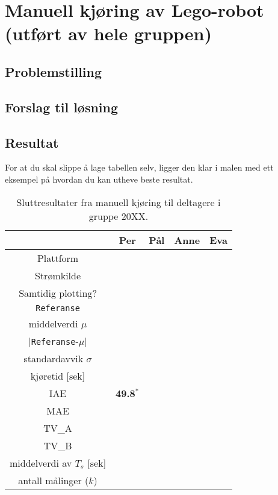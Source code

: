 \documentclass{./main.tex}[subfiles]
\begin{document}
\chapter{Manuell kjøring av Lego-robot (utført av hele gruppen)}\label{kap:manuell_kjoring}

\section{Problemstilling}

\section{Forslag til løsning}

\section{Resultat}

For at du skal slippe å lage tabellen selv, ligger den klar i malen
med ett eksempel på hvordan du kan utheve beste resultat.
\begin{table}[H]
  \centering
  \renewcommand{\arraystretch}{1.2}
  \caption{Sluttresultater fra manuell kjøring til deltagere i gruppe 20XX.}
  \hspace*{0mm}  \begin{tabular}{|c|c|c|c|c|}   \hline
                                 & Per              & Pål & Anne & Eva \\\hline\hline
    Plattform                    &                  &     &      &     \\\hline
    Strømkilde                   &                  &     &      &     \\\hline
    Samtidig plotting?           &                  &     &      &     \\\hline
    {\tt Referanse}              &                  &     &      &     \\\hline
    middelverdi $\mu$            &                  &     &      &     \\\hline
    |{\tt Referanse}-$\mu$|      &                  &     &      &     \\\hline
    standardavvik $\sigma$       &                  &     &      &     \\\hline
    kjøretid [sek]               &                  &     &      &     \\\hline
    IAE                          & {\bf 49.8}$^{*}$ &     &      &     \\\hline
    MAE                          &                  &     &      &     \\\hline
    TV\_A                        &                  &     &      &     \\\hline
    TV\_B                        &                  &     &      &     \\\hline
    middelverdi av $T_{s}$ [sek] &                  &     &      &     \\\hline
    antall målinger ($k$)        &                  &     &      &     \\\hline
  \end{tabular}    \label{tab:tall}
\end{table}
\end{document}

